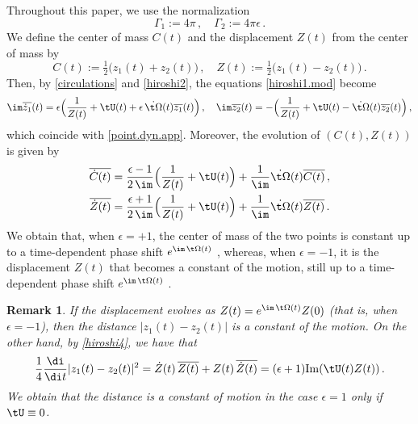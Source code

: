 \documentclass[a4paper,reqno,10pt]{article}
\newtheorem{rem}{Remark}[section]
\begin{document}
   Throughout this paper, we use the normalization 
 \begin{equation}\label{circulations}
 	\Gamma_{1}:= 4\pi\,, \quad \Gamma_{2} := 4\pi \epsilon\,.
 \end{equation}
 We define the center of mass $C(t)$ and the displacement $Z(t)$ from the center of mass by
 \begin{equation}\label{hiroshi2}
 	C(t) := \tfrac12\big( z_1(t) + z_2(t)  \big) \,, \quad Z(t) := \tfrac12\big( z_1(t) - z_2(t)  \big)\,.
 \end{equation}
 Then, by \eqref{circulations} and \eqref{hiroshi2}, the equations \eqref{hiroshi1.mod} become
 \begin{equation}\label{hiroshi3}
 		\im \overline{\dot{z}_1} (t) =  \epsilon\Big(\frac{1}{Z(t)} + \tU(t) +\epsilon\, \dot{\t\Omega}(t) \overline{{z}_1}(t) \Big) \,, \quad  	\im   \overline{z_2} (t) =   -\Big(\frac{1}{Z(t)} + \tU(t) - \dot{\t\Omega}(t) \overline{z_2}(t) \Big)\,, 
 \end{equation}
 which coincide with \eqref{point.dyn.app}. Moreover, the evolution of $(C(t),Z(t))$ is given by
 \begin{equation}\label{hiroshi4}
 \begin{aligned}
 		 \overline{\dot{C}(t)} & = \frac{\epsilon-1}{2\,\im} \Big(\frac{1}{Z(t)} + \tU(t) \Big) + \frac{1}{\im} \dot{\t\Omega}(t) \overline{C(t)}  \,, \\
 		\overline{\dot{Z}(t)} & = \frac{\epsilon+1}{2\,\im} \Big(\frac{1}{Z(t)} + \tU(t) \Big) + \frac{1}{\im} \dot{\t\Omega}(t) \overline{Z(t)} \,.
 \end{aligned}
 \end{equation}
 We obtain that, when $\epsilon= +1$, the center of mass of the two points is constant up to a time-dependent phase shift $e^{\im\,\t\Omega(t)}$ , whereas, when $\epsilon = -1$, it is the displacement $Z(t)$ that becomes a constant of the motion, still up to a time-dependent phase shift $e^{\im\,\t\Omega(t)}$ . 
 \begin{rem}\label{remark.distance}
 	 If the displacement evolves as $Z(t)=e^{\im\,\t\Omega(t)} Z(0)$ (that is, when $\epsilon=-1$), then the distance $|z_1(t)- z_2(t)|$ is a constant of the motion. On the other hand, by \eqref{hiroshi4}, we have that
 	\begin{equation}
 		\frac14 \frac{\di}{\di t} |z_1(t) - z_2(t) |^2 = \dot{Z}(t) \, \overline{Z(t)} + Z(t)\,  \overline{\dot{Z}(t)} = (\epsilon+1) {\rm Im} (\tU(t) Z(t)) \,.
 	\end{equation}
 	We obtain that the distance is a constant of motion in the  case $\epsilon= 1$ only if $\tU\equiv 0$.
 \end{rem}
\end{document}
